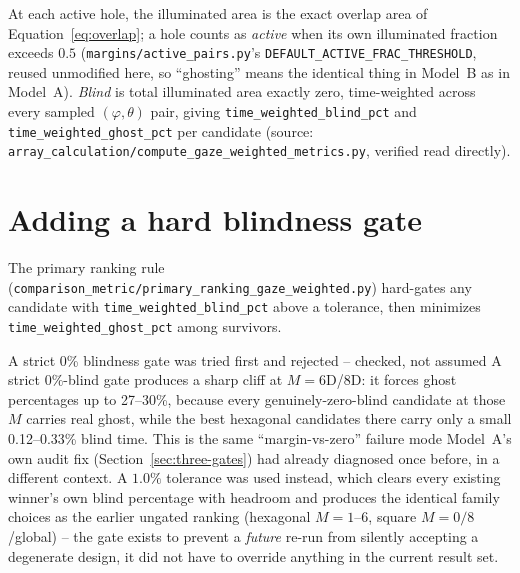 At each active hole, the illuminated area is the exact overlap area of
Equation~\ref{eq:overlap}; a hole counts as \emph{active} when its own illuminated
fraction exceeds $0.5$ (\texttt{margins/active\_pairs.py}'s
\texttt{DEFAULT\_ACTIVE\_FRAC\_THRESHOLD}, reused unmodified here, so ``ghosting'' means
the identical thing in Model~B as in Model~A). \textit{Blind} is total illuminated area
exactly zero, time-weighted across every sampled $(\varphi,\theta)$ pair, giving
\texttt{time\_weighted\_blind\_pct} and \texttt{time\_weighted\_ghost\_pct} per candidate
(source: \texttt{array\_calculation/compute\_gaze\_weighted\_metrics.py}, verified read
directly).

\section{Adding a hard blindness gate}
\label{sec:blindness-gate}
The primary ranking rule (\texttt{comparison\_metric/primary\_ranking\_gaze\_weighted.py})
hard-gates any candidate with \texttt{time\_weighted\_blind\_pct} above a tolerance,
then minimizes \texttt{time\_weighted\_ghost\_pct} among survivors.

\begin{warnbox}{A strict 0\% blindness gate was tried first and rejected -- checked, not assumed}
A strict $0\%$-blind gate produces a sharp cliff at $M=6$D/$8$D: it forces ghost
percentages up to 27--30\%, because every genuinely-zero-blind candidate at those $M$
carries real ghost, while the best hexagonal candidates there carry only a small
0.12--0.33\% blind time. This is the same ``margin-vs-zero'' failure mode Model~A's own
audit fix (Section~\ref{sec:three-gates}) had already diagnosed once before, in a
different context. A $1.0\%$ tolerance was used instead, which clears every existing
winner's own blind percentage with headroom and produces the identical family choices
as the earlier ungated ranking (hexagonal $M=1$--$6$, square $M=0/8$/global) -- the gate
exists to prevent a \emph{future} re-run from silently accepting a degenerate design, it
did not have to override anything in the current result set.
\end{warnbox}

